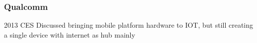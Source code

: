 
\subsubsection{Qualcomm} %
\label{ssub:qualcomm}
2013 CES Discussed bringing mobile platform hardware to IOT, but still creating a single device with internet as hub mainly 


